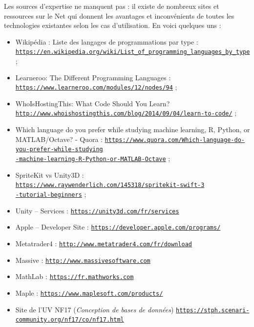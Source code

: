 \documentclass[a4paper,12pt]{article}
\begin{document}
    Les sources d'expertise ne manquent pas : il existe de nombreux sites et ressources sur le Net qui donnent les avantages et inconvénients de toutes les technologies existantes selon les cas d'utilisation. En voici quelques uns :
    \begin{itemize}
        \item Wikipédia : Liste des langages de programmations par type :\\ \href{https://en.wikipedia.org/wiki/List_of_programming_languages_by_type}{\texttt{https://en.wikipedia.org/wiki/List\_of\_programming\_languages\_by\_type}} ;
        \item Learneroo: The Different Programming Languages :\\ \href{https://www.learneroo.com/modules/12/nodes/94}{\texttt{https://www.learneroo.com/modules/12/nodes/94}} ;
        \item WhoIsHostingThis: What Code Should You Learn?\\ \href{http://www.whoishostingthis.com/blog/2014/09/04/learn-to-code/}{\texttt{http://www.whoishostingthis.com/blog/2014/09/04/learn-to-code/}} ;
        \item Which language do you prefer while studying machine learning, R, Python, or MATLAB/Octave? - Quora : \href{https://www.quora.com/Which-language-do-you-prefer-while-studying-machine-learning-R-Python-or-MATLAB-Octave}{\texttt{https://www.quora.com/Which-language-do-you-prefer-while-studying\\-machine-learning-R-Python-or-MATLAB-Octave}} ;
       \item SpriteKit vs Unity3D : \href{https://www.raywenderlich.com/145318/spritekit-swift-3-tutorial-beginners}{\texttt{https://www.raywenderlich.com/145318/spritekit-swift-3\\-tutorial-beginners}} ;
       \item Unity -- Services : \href{https://unity3d.com/fr/services}{\texttt{https://unity3d.com/fr/services}}
       \item Apple -- Developer Site : \href{https://developer.apple.com/programs/}{\texttt{https://developer.apple.com/programs/}}
       \item Metatrader4 : \href{http://www.metatrader4.com/fr/download}{\texttt{http://www.metatrader4.com/fr/download}}
       \item Massive : \href{http://www.massivesoftware.com}{\texttt{http://www.massivesoftware.com}}
       \item MathLab : \href{https://fr.mathworks.com}{\texttt{https://fr.mathworks.com}}
       \item Maple : \href{https://www.maplesoft.com/products/}{\texttt{https://www.maplesoft.com/products/}}
       \item Site de l'UV NF17 (\textit{Conception de bases de données}) \href{https://stph.scenari-\\community.org/nf17/co/nf17.html}{\texttt{https://stph.scenari-community.org/nf17/co/nf17.html}}
                            
    \end{itemize}
\end{document}
